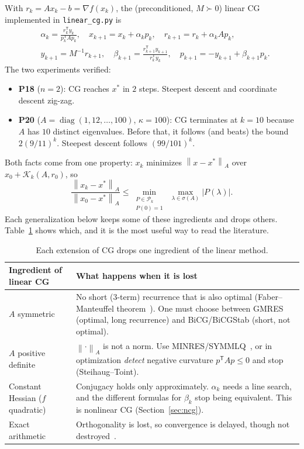 \documentclass[11pt,a4paper]{article}
\theoremstyle{remark}
\newcommand{\K}{\mathcal{K}}
\newcommand{\norm}[1]{\left\lVert #1\right\rVert}
\newcommand{\ip}[2]{#1^{\mathsf T}#2}
\newcommand{\T}{^{\mathsf T}}
\begin{document}
With $r_k = Ax_k - b = \nabla f(x_k)$, the (preconditioned, $M\succ0$) linear CG implemented in \texttt{linear\_cg.py} is
\begin{equation}\label{eq:lcg}
\begin{aligned}
&\alpha_k = \frac{\ip{r_k}{y_k}}{\ip{p_k}{Ap_k}},\quad
x_{k+1}=x_k+\alpha_k p_k,\quad
r_{k+1}=r_k+\alpha_k Ap_k,\\
&y_{k+1}=M^{-1}r_{k+1},\quad
\beta_{k+1}=\frac{\ip{r_{k+1}}{y_{k+1}}}{\ip{r_k}{y_k}},\quad
p_{k+1}=-y_{k+1}+\beta_{k+1}p_k .
\end{aligned}
\end{equation}
The two experiments verified:
\begin{itemize}[leftmargin=1.5em]
\item \textbf{P18} ($n=2$): CG reaches $x^*$ in $2$ steps. Steepest descent and coordinate descent zig-zag.
\item \textbf{P20} ($A=\operatorname{diag}(1,12,\dots,100)$, $\kappa=100$): CG terminates at $k=10$ because $A$ has $10$ distinct eigenvalues. Before that, it follows (and beats) the bound $2(9/11)^k$. Steepest descent follows $(99/101)^k$.
\end{itemize}
Both facts come from one property: $x_k$ minimizes $\norm{x-x^*}_A$ over $x_0+\K_k(A,r_0)$, so
\[
\frac{\norm{x_k-x^*}_A}{\norm{x_0-x^*}_A}\le \min_{\substack{P\in\mathcal P_k\\P(0)=1}}\ \max_{\lambda\in\sigma(A)}|P(\lambda)|.
\]
Each generalization below keeps some of these ingredients and drops others. Table~\ref{tab:ingredients} shows which, and it is the most useful way to read the literature.

\begin{table}[h]
\centering\small
\begin{tabularx}{\textwidth}{>{\raggedright\arraybackslash}p{4.2cm}X}
\toprule
Ingredient of linear CG & What happens when it is lost \\
\midrule
$A$ symmetric & No short (3-term) recurrence that is also optimal (Faber--Manteuffel theorem~\cite{FaberManteuffel1984}). One must choose between GMRES (optimal, long recurrence) and BiCG/BiCGStab (short, not optimal).\\
$A$ positive definite & $\norm{\cdot}_A$ is not a norm. Use MINRES/SYMMLQ~\cite{PaigeSaunders1975}, or in optimization \emph{detect} negative curvature $p\T Ap\le 0$ and stop (Steihaug--Toint).\\
Constant Hessian ($f$ quadratic) & Conjugacy holds only approximately. $\alpha_k$ needs a line search, and the different formulas for $\beta_k$ stop being equivalent. This is nonlinear CG (Section~\ref{sec:ncg}).\\
Exact arithmetic & Orthogonality is lost, so convergence is delayed, though not destroyed~\cite{MeurantStrakos2006,CarsonLiesenStrakos2024}.\\
\bottomrule
\end{tabularx}
\caption{Each extension of CG drops one ingredient of the linear method.}
\label{tab:ingredients}
\end{table}
\end{document}

